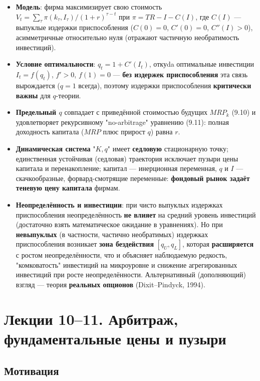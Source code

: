 \documentclass[10pt,a4paper]{article}
\begin{document}
\begin{itemize}[leftmargin=1.3em]
\item \textbf{Модель}: фирма максимизирует свою стоимость $V_t=\sum_\tau \pi(k_\tau,I_\tau)/(1+r)^{\tau-t}$ при $\pi=TR-I-C(I)$, где $C(I)$ — выпуклые издержки приспособления ($C(0)=0$, $C'(0)=0$, $C''(I)>0$), асимметричные относительно нуля (отражают частичную необратимость инвестиций).
\item \textbf{Условие оптимальности}: $q_t=1+C'(I_t)$, откуda оптимальные инвестиции $I_t=f(q_t)$, $f'>0$, $f(1)=0$ — \textbf{без издержек приспособления} эта связь вырождается ($q=1$ всегда), поэтому издержки приспособления \textbf{критически важны} для $q$-теории.
\item \textbf{Предельный $q$} совпадает с приведённой стоимостью будущих $MRP_k$ (9.10) и удовлетворяет рекурсивному "no-arbitrage" уравнению (9.11): полная доходность капитала ($MRP$ плюс прирост $q$) равна $r$.
\item \textbf{Динамическая система} "$K,q$" имеет \textbf{седловую} стационарную точку; единственная устойчивая (седловая) траектория исключает пузыри цены капитала и перенакопление; капитал — инерционная переменная, $q$ и $I$ — скачкообразные, форвард-смотрящие переменные: \textbf{фондовый рынок задаёт теневую цену капитала} фирмам.
\item \textbf{Неопределённость и инвестиции}: при чисто выпуклых издержках приспособления неопределённость \textbf{не влияет} на средний уровень инвестиций (достаточно взять математическое ожидание в уравнениях). Но при \textbf{невыпуклых} (в частности, частично необратимых) издержках приспособления возникает \textbf{зона бездействия} $[q_U,q_L]$, которая \textbf{расширяется} с ростом неопределённости, что и объясняет наблюдаемую редкость, "комковатость" инвестиций на микроуровне и снижение агрегированных инвестиций при росте неопределённости. Альтернативный (дополняющий) взгляд — теория \textbf{реальных опционов} (Dixit--Pindyck, 1994).
\end{itemize}

\newpage
\section{Лекции 10--11. Арбитраж, фундаментальные цены и пузыри}

\subsection{Мотивация}
\end{document}

